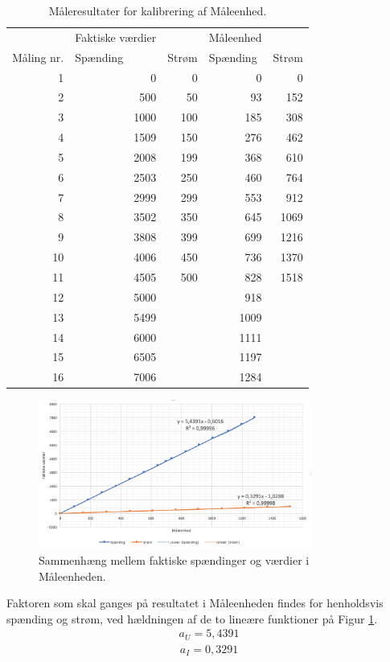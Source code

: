 \begin{table}[htbp]
	\centering
	\caption{Måleresultater for kalibrering af Måleenhed.}
	\begin{tabular}{rrrrr}
		\toprule
		& \multicolumn{1}{l}{Faktiske værdier} &       & \multicolumn{1}{l}{Måleenhed} &  \\
		\multicolumn{1}{l}{Måling nr. } & \multicolumn{1}{l}{Spænding} & \multicolumn{1}{l}{Strøm} & \multicolumn{1}{l}{Spænding } & \multicolumn{1}{l}{Strøm} \\
		\midrule
		1     & 0     & 0     & 0     & 0 \\
		2     & 500   & 50    & 93    & 152 \\
		3     & 1000  & 100   & 185   & 308 \\
		4     & 1509  & 150   & 276   & 462 \\
		5     & 2008  & 199   & 368   & 610 \\
		6     & 2503  & 250   & 460   & 764 \\
		7     & 2999  & 299   & 553   & 912 \\
		8     & 3502  & 350   & 645   & 1069 \\
		9     & 3808  & 399   & 699   & 1216 \\
		10    & 4006  & 450   & 736   & 1370 \\
		11    & 4505  & 500   & 828   & 1518 \\
		12    & 5000  &       & 918   &  \\
		13    & 5499  &       & 1009  &  \\
		14    & 6000  &       & 1111  &  \\
		15    & 6505  &       & 1197  &  \\
		16    & 7006  &       & 1284  &  \\
		\bottomrule
	\end{tabular}%
	\label{tab:MEkalibrering}%
\end{table}%

\begin{figure}[H]
	\centering
	\includegraphics[width=0.80\textwidth]{Figure/MEkalibreringgraf}
	\caption{Sammenhæng mellem faktiske spændinger og værdier i Måleenheden.}
	\label{fig:MEgraf}
\end{figure}

Faktoren som skal ganges på resultatet i Måleenheden findes for henholdsvis spænding og strøm, ved hældningen af de to lineære funktioner på Figur \ref{fig:MEgraf}.
\begin{align}
	a_{U} = 5,4391
\end{align}
\begin{align}
a_{I} = 0,3291
\end{align}
